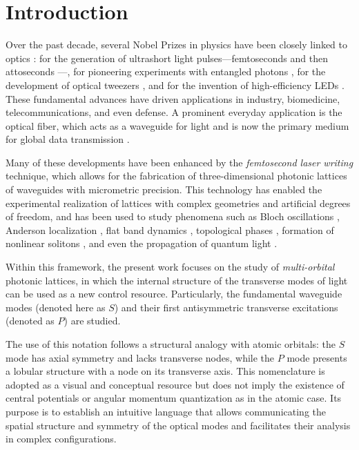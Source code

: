 \chapter{Introduction}

Over the past decade, several Nobel Prizes in physics have been closely linked to optics \cite{nobel}: for the generation of ultrashort light pulses—femtoseconds \cite{femto1} and then attoseconds \cite{atto1, atto2, atto3}—, for pioneering experiments with entangled photons \cite{photons1, photons2, photons3}, for the development of optical tweezers \cite{opticaltweezers}, and for the invention of high-efficiency LEDs \cite{led1, led2, led3}. These fundamental advances have driven applications in industry, biomedicine, telecommunications, and even defense. A prominent everyday application is the optical fiber, which acts as a waveguide for light and is now the primary medium for global data transmission \cite{fibra2, fibra}.

Many of these developments have been enhanced by the \textit{femtosecond laser writing} technique, which allows for the fabrication of three-dimensional photonic lattices of waveguides with micrometric precision. This technology has enabled the experimental realization of lattices with complex geometries and artificial degrees of freedom, and has been used to study phenomena such as Bloch oscillations \cite{BlochOsci}, Anderson localization \cite{Anderson}, flat band dynamics \cite{lieb1, lieb2, artificialFB, FBdynamics}, topological phases \cite{obstopo, obsfloquet, topo1dphoto, toporusos}, formation of nonlinear solitons \cite{discretesolitons}, and even the propagation of quantum light \cite{qed, squeezed, topoquantum}.

Within this framework, the present work focuses on the study of \textit{multi-orbital} photonic lattices, in which the internal structure of the transverse modes of light can be used as a new control resource. Particularly, the fundamental waveguide modes (denoted here as $S$) and their first antisymmetric transverse excitations (denoted as $P$) are studied.

The use of this notation follows a structural analogy with atomic orbitals: the $S$ mode has axial symmetry and lacks transverse nodes, while the $P$ mode presents a lobular structure with a node on its transverse axis. This nomenclature is adopted as a visual and conceptual resource but does not imply the existence of central potentials or angular momentum quantization as in the atomic case. Its purpose is to establish an intuitive language that allows communicating the spatial structure and symmetry of the optical modes and facilitates their analysis in complex configurations.


